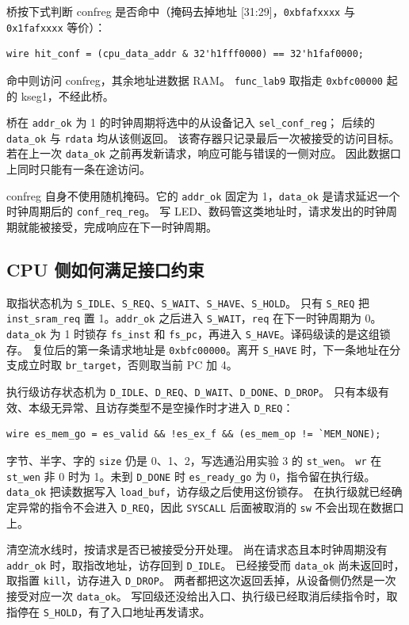 \documentclass{article}
\begin{document}
桥按下式判断 confreg 是否命中（掩码去掉地址 [31:29]，\texttt{0xbfafxxxx} 与 \texttt{0x1fafxxxx} 等价）：
\begin{verbatim}
wire hit_conf = (cpu_data_addr & 32'h1fff0000) == 32'h1faf0000;
\end{verbatim}
命中则访问 confreg，其余地址进数据 RAM。
\texttt{func\_lab9} 取指走 \texttt{0xbfc00000} 起的 kseg1，不经此桥。

桥在 \texttt{addr\_ok} 为 1 的时钟周期将选中的从设备记入 \texttt{sel\_conf\_reg}；
后续的 \texttt{data\_ok} 与 \texttt{rdata} 均从该侧返回。
该寄存器只记录最后一次被接受的访问目标。
若在上一次 \texttt{data\_ok} 之前再发新请求，响应可能与错误的一侧对应。
因此数据口上同时只能有一条在途访问。

confreg 自身不使用随机掩码。它的 \texttt{addr\_ok} 固定为 1，\texttt{data\_ok} 是请求延迟一个时钟周期后的 \texttt{conf\_req\_reg}。
写 LED、数码管这类地址时，请求发出的时钟周期就能被接受，完成响应在下一时钟周期。

\subsection{CPU 侧如何满足接口约束}
取指状态机为 \texttt{S\_IDLE}、\texttt{S\_REQ}、\texttt{S\_WAIT}、\texttt{S\_HAVE}、\texttt{S\_HOLD}。
只有 \texttt{S\_REQ} 把 \texttt{inst\_sram\_req} 置 1。\texttt{addr\_ok} 之后进入 \texttt{S\_WAIT}，\texttt{req} 在下一时钟周期为 0。
\texttt{data\_ok} 为 1 时锁存 \texttt{fs\_inst} 和 \texttt{fs\_pc}，再进入 \texttt{S\_HAVE}。译码级读的是这组锁存。
复位后的第一条请求地址是 \texttt{0xbfc00000}。离开 \texttt{S\_HAVE} 时，下一条地址在分支成立时取 \texttt{br\_target}，否则取当前 PC 加 4。

执行级访存状态机为 \texttt{D\_IDLE}、\texttt{D\_REQ}、\texttt{D\_WAIT}、\texttt{D\_DONE}、\texttt{D\_DROP}。
只有本级有效、本级无异常、且访存类型不是空操作时才进入 \texttt{D\_REQ}：
\begin{verbatim}
wire es_mem_go = es_valid && !es_ex_f && (es_mem_op != `MEM_NONE);
\end{verbatim}
字节、半字、字的 \texttt{size} 仍是 0、1、2，写选通沿用实验 3 的 \texttt{st\_wen}。
\texttt{wr} 在 \texttt{st\_wen} 非 0 时为 1。未到 \texttt{D\_DONE} 时 \texttt{es\_ready\_go} 为 0，指令留在执行级。
\texttt{data\_ok} 把读数据写入 \texttt{load\_buf}，访存级之后使用这份锁存。
在执行级就已经确定异常的指令不会进入 \texttt{D\_REQ}，因此 \texttt{SYSCALL} 后面被取消的 \texttt{sw} 不会出现在数据口上。

清空流水线时，按请求是否已被接受分开处理。
尚在请求态且本时钟周期没有 \texttt{addr\_ok} 时，取指改地址，访存回到 \texttt{D\_IDLE}。
已经接受而 \texttt{data\_ok} 尚未返回时，取指置 \texttt{kill}，访存进入 \texttt{D\_DROP}。
两者都把这次返回丢掉，从设备侧仍然是一次接受对应一次 \texttt{data\_ok}。
写回级还没给出入口、执行级已经取消后续指令时，取指停在 \texttt{S\_HOLD}，有了入口地址再发请求。
\end{document}
